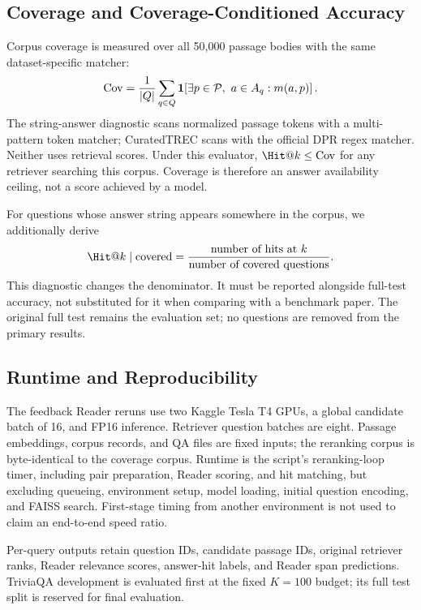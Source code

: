 \subsection{Coverage and Coverage-Conditioned Accuracy}
Corpus coverage is measured over all 50,000 passage bodies with the same dataset-specific matcher:
\begin{equation}
\operatorname{Cov}=\frac{1}{|Q|}\sum_{q\in Q}
\mathbf{1}\!\left[\exists p\in\mathcal{P},\ a\in A_q:m(a,p)\right].
\label{eq:coverage}
\end{equation}
The string-answer diagnostic scans normalized passage tokens with a multi-pattern token matcher; CuratedTREC scans with the official DPR regex matcher. Neither uses retrieval scores. Under this evaluator, $\Hit@k\leq\Cov$ for any retriever searching this corpus. Coverage is therefore an answer availability ceiling, not a score achieved by a model.

For questions whose answer string appears somewhere in the corpus, we additionally derive
\begin{equation}
\Hit@k\mid\mathrm{covered}
=\frac{\text{number of hits at }k}{\text{number of covered questions}}.
\label{eq:conditional}
\end{equation}
This diagnostic changes the denominator. It must be reported alongside full-test accuracy, not substituted for it when comparing with a benchmark paper. The original full test remains the evaluation set; no questions are removed from the primary results.

\subsection{Runtime and Reproducibility}
The feedback Reader reruns use two Kaggle Tesla T4 GPUs, a global candidate batch of 16, and FP16 inference. Retriever question batches are eight. Passage embeddings, corpus records, and QA files are fixed inputs; the reranking corpus is byte-identical to the coverage corpus. Runtime is the script's reranking-loop timer, including pair preparation, Reader scoring, and hit matching, but excluding queueing, environment setup, model loading, initial question encoding, and FAISS search. First-stage timing from another environment is not used to claim an end-to-end speed ratio.

Per-query outputs retain question IDs, candidate passage IDs, original retriever ranks, Reader relevance scores, answer-hit labels, and Reader span predictions. TriviaQA development is evaluated first at the fixed $K=100$ budget; its full test split is reserved for final evaluation.
